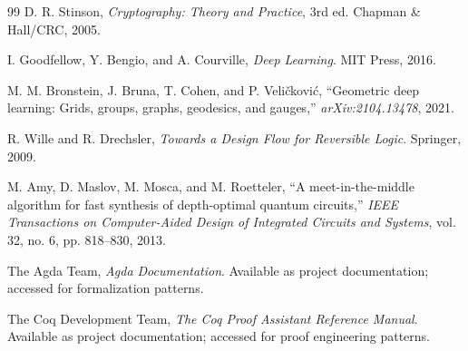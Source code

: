 \documentclass[11pt]{article}
\begin{document}
\begin{thebibliography}{99}
 D. R. Stinson, \emph{Cryptography: Theory and Practice}, 3rd ed. Chapman \& Hall/CRC, 2005.

 I. Goodfellow, Y. Bengio, and A. Courville, \emph{Deep Learning}. MIT Press, 2016.

 M. M. Bronstein, J. Bruna, T. Cohen, and P. Veli\v{c}kovi\'c, ``Geometric deep learning: Grids, groups, graphs, geodesics, and gauges,'' \emph{arXiv:2104.13478}, 2021.

 R. Wille and R. Drechsler, \emph{Towards a Design Flow for Reversible Logic}. Springer, 2009.

 M. Amy, D. Maslov, M. Mosca, and M. Roetteler, ``A meet-in-the-middle algorithm for fast synthesis of depth-optimal quantum circuits,'' \emph{IEEE Transactions on Computer-Aided Design of Integrated Circuits and Systems}, vol. 32, no. 6, pp. 818--830, 2013.

 The Agda Team, \emph{Agda Documentation}. Available as project documentation; accessed for formalization patterns.

 The Coq Development Team, \emph{The Coq Proof Assistant Reference Manual}. Available as project documentation; accessed for proof engineering patterns.

\end{thebibliography}
\end{document}
